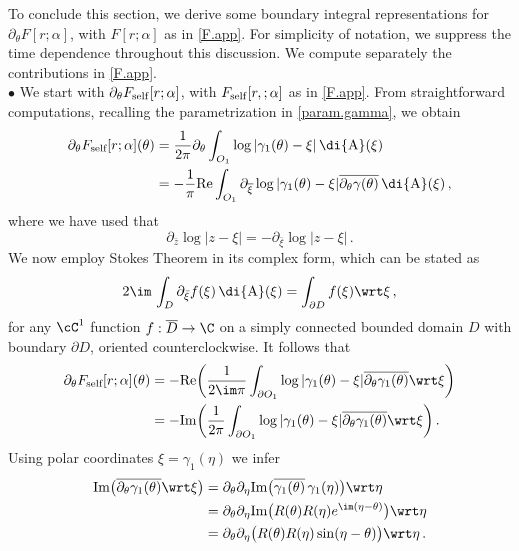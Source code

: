 \documentclass[a4paper,reqno,10pt]{article}
\newcommand{\pa}{\partial}
\newcommand{\wrta}{\,\di {\rm A}}
\begin{document}
 To conclude this section, we derive some boundary integral representations for $\pa_{\theta}F[r;\alpha]$, with $F[r;\alpha]$ as  in \eqref{F.app}. For simplicity of notation, we suppress the time dependence throughout this discussion. 
 We compute separately the contributions in \eqref{F.app}.
 \\[1mm]
 \noindent $\bullet$ We start with $\pa_{\theta}F_{\rm self}[r;\alpha]$, with $F_{\rm self}[r,;\alpha]$ as in \eqref{F.app}.
 From straightforward computations, recalling the parametrization in \eqref{param.gamma}, we obtain
\begin{align}
		\partial_\theta F_{\textnormal{self}}[r;\alpha](\theta)&=
\frac{1}{2\pi} \partial_\theta\int_{O_{1}} \log |  \gamma_1(\theta) -\xi | \wrta(\xi)\\
&=-\frac{1}{\pi}{\rm Re} \int_{O_{1}} \partial_{\overline{\xi}}\log |  \gamma_1(\theta) -\xi |\overline{\partial_\theta\gamma(\theta)} \wrta(\xi)\,,
\end{align}
where we have used that
\begin{equation}\label{partiaz-log}
    \pa_{\bar z} \log |z-\xi| = - \pa_{\bar \xi} \log |z-\xi| \,.
\end{equation}
We now employ Stokes Theorem in its complex form, which can be stated  as
\begin{equation}\label{stokes.complex.app}
	2 \im \, \int_{D} \pa_{\bar \xi} f(\xi) \wrta(\xi) = \int_{\pa D} f(\xi) \wrt\xi\,,
\end{equation}
for any $\cC^1$ function $f:\overline D \to \C$  on a simply connected bounded domain $D$ with boundary $\pa D$,  oriented counterclockwise. It follows that
\begin{align}\label{Fself-1}
	\nonumber 	\partial_\theta F_{\textnormal{self}}[r;\alpha](\theta)
&=-{\rm Re} \bigg(\frac{1}{2\im \pi}\int_{\partial O_{1}} \log |  \gamma_1(\theta) -\xi |\overline{\partial_\theta\gamma_1(\theta)} \wrt \xi\bigg)\\
&=-{\rm Im} \bigg(\frac{1}{2\pi}\int_{\partial O_{1}} \log |  \gamma_1(\theta) -\xi |\overline{\partial_\theta\gamma_1(\theta)} \wrt \xi\bigg)\,.
\end{align}
Using polar coordinates $\xi=\gamma_{1}(\eta)$ we infer
\begin{align*}
{\rm Im}\big(\overline{\partial_\theta\gamma_1(\theta)} \wrt \xi\big)&=\partial_\theta\partial_\eta {\rm Im}\big(\overline{\gamma_1(\theta)}\,\gamma_1(\eta) \big) \wrt \eta\\
&=\partial_\theta\partial_\eta {\rm Im}\big(R(\theta) R(\eta) e^{\im (\eta-\theta)} \big) \wrt \eta\\
&=\partial_\theta\partial_\eta \big(R(\theta) R(\eta) \sin( \eta-\theta) \big) \wrt \eta\,.
\end{align*}
\end{document}
